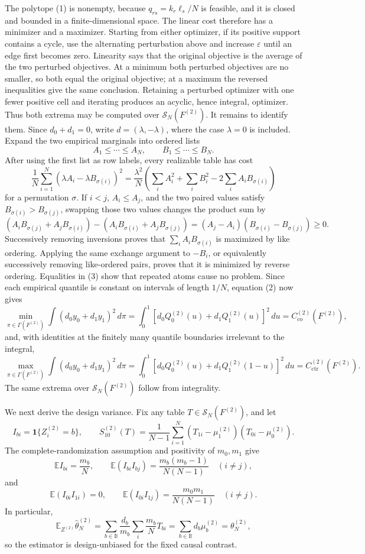 The polytope (1) is nonempty, because \(q_{rs}=k_r\ell_s/N\) is feasible, and it is closed and bounded in a finite-dimensional space.  The linear cost therefore has a minimizer and a maximizer.  Starting from either optimizer, if its positive support contains a cycle, use the alternating perturbation above and increase \(\varepsilon\) until an edge first becomes zero.  Linearity says that the original objective is the average of the two perturbed objectives.  At a minimum both perturbed objectives are no smaller, so both equal the original objective; at a maximum the reversed inequalities give the same conclusion.  Retaining a perturbed optimizer with one fewer positive cell and iterating produces an acyclic, hence integral, optimizer.  Thus both extrema may be computed over \(\mathcal S_N(F^{(2)})\).  It remains to identify them.  Since \(d_0+d_1=0\), write \(d=(\lambda,-\lambda)\), where the case \(\lambda=0\) is included.  Expand the two empirical marginals into ordered lists
\[
A_1\leq\cdots\leq A_N,\qquad B_1\leq\cdots\leq B_N.
\]
After using the first list as row labels, every realizable table has cost
\[
\frac1N\sum_{i=1}^N(\lambda A_i-\lambda B_{\sigma(i)})^2
=\frac{\lambda^2}{N}\left(\sum_i A_i^2+\sum_iB_i^2-2\sum_iA_iB_{\sigma(i)}\right) \tag{2}
\]
for a permutation \(\sigma\).  If \(i<j\), \(A_i\leq A_j\), and the two paired values satisfy \(B_{\sigma(i)}>B_{\sigma(j)}\), swapping those two values changes the product sum by
\[
(A_iB_{\sigma(j)}+A_jB_{\sigma(i)})
 -(A_iB_{\sigma(i)}+A_jB_{\sigma(j)})
=(A_j-A_i)(B_{\sigma(i)}-B_{\sigma(j)})\geq0. \tag{3}
\]
Successively removing inversions proves that \(\sum_iA_iB_{\sigma(i)}\) is maximized by like ordering.  Applying the same exchange argument to \(-B_i\), or equivalently successively removing like-ordered pairs, proves that it is minimized by reverse ordering.  Equalities in (3) show that repeated atoms cause no problem.  Since each empirical quantile is constant on intervals of length \(1/N\), equation (2) now gives
\[
\min_{\pi\in\Gamma(F^{(2)})}\int(d_0y_0+d_1y_1)^2\,d\pi
=\int_0^1[d_0Q_0^{(2)}(u)+d_1Q_1^{(2)}(u)]^2\,du
=C_{\mathrm{co}}^{(2)}(F^{(2)}), \tag{4}
\]
and, with identities at the finitely many quantile boundaries irrelevant to the integral,
\[
\max_{\pi\in\Gamma(F^{(2)})}\int(d_0y_0+d_1y_1)^2\,d\pi
=\int_0^1[d_0Q_0^{(2)}(u)+d_1Q_1^{(2)}(1-u)]^2\,du
=C_{\mathrm{ctr}}^{(2)}(F^{(2)}). \tag{5}
\]
The same extrema over \(\mathcal S_N(F^{(2)})\) follow from integrality.

We next derive the design variance.  Fix any table \(T\in\mathcal S_N(F^{(2)})\), and let
\[
I_{bi}=\mathbf 1\{Z_i^{(2)}=b\},\qquad
S_{10}^{(2)}(T)=\frac1{N-1}\sum_{i=1}^N(T_{1i}-\mu_1^{(2)})(T_{0i}-\mu_0^{(2)}).
\]
The complete-randomization assumption and positivity of \(m_0,m_1\) give
\[
\mathbb E I_{bi}=\frac{m_b}{N},\qquad
\mathbb E(I_{bi}I_{bj})=\frac{m_b(m_b-1)}{N(N-1)}\quad(i\ne j), \tag{6}
\]
and
\[
\mathbb E(I_{0i}I_{1i})=0,\qquad
\mathbb E(I_{0i}I_{1j})=\frac{m_0m_1}{N(N-1)}\quad(i\ne j). \tag{7}
\]
In particular,
\[
\mathbb E_{Z^{(2)}}\widehat\theta_N^{(2)}
=\sum_{b\in\mathbb B}\frac{d_b}{m_b}\sum_i\frac{m_b}{N}T_{bi}
=\sum_{b\in\mathbb B}d_b\mu_b^{(2)}
=\theta_N^{(2)}, \tag{8}
\]
so the estimator is design-unbiased for the fixed causal contrast.

